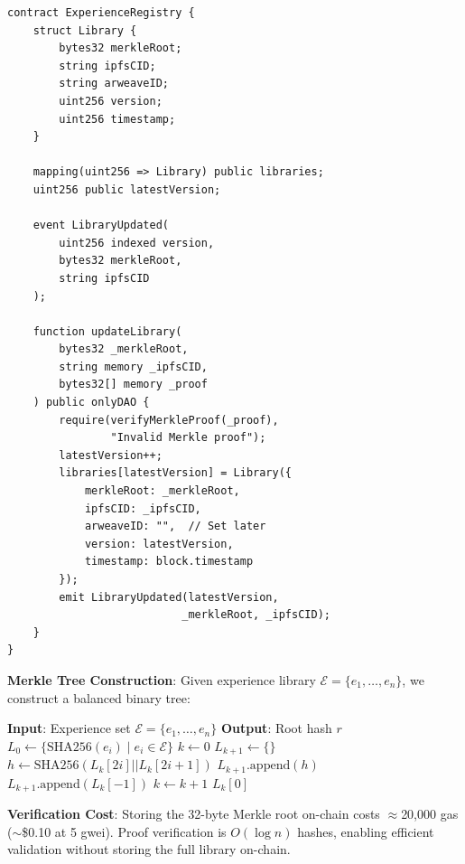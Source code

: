 \begin{lstlisting}[language=Solidity,caption=Experience Registry Contract (Simplified)]
contract ExperienceRegistry {
    struct Library {
        bytes32 merkleRoot;
        string ipfsCID;
        string arweaveID;
        uint256 version;
        uint256 timestamp;
    }
    
    mapping(uint256 => Library) public libraries;
    uint256 public latestVersion;
    
    event LibraryUpdated(
        uint256 indexed version,
        bytes32 merkleRoot,
        string ipfsCID
    );
    
    function updateLibrary(
        bytes32 _merkleRoot,
        string memory _ipfsCID,
        bytes32[] memory _proof
    ) public onlyDAO {
        require(verifyMerkleProof(_proof), 
                "Invalid Merkle proof");
        latestVersion++;
        libraries[latestVersion] = Library({
            merkleRoot: _merkleRoot,
            ipfsCID: _ipfsCID,
            arweaveID: "",  // Set later
            version: latestVersion,
            timestamp: block.timestamp
        });
        emit LibraryUpdated(latestVersion, 
                           _merkleRoot, _ipfsCID);
    }
}
\end{lstlisting}

\textbf{Merkle Tree Construction}: Given experience library $\mathcal{E} = \{e_1, \ldots, e_n\}$, we construct a balanced binary tree:

\begin{algorithm}[t]
\caption{Merkle Tree Construction}
\label{alg:merkle}
\begin{algorithmic}[1]
\STATE \textbf{Input}: Experience set $\mathcal{E} = \{e_1, \ldots, e_n\}$
\STATE \textbf{Output}: Root hash $r$
\STATE $L_0 \leftarrow \{\text{SHA256}(e_i) \mid e_i \in \mathcal{E}\}$
\STATE $k \leftarrow 0$
    \STATE $L_{k+1} \leftarrow \{\}$
        \STATE $h \leftarrow \text{SHA256}(L_k[2i] || L_k[2i+1])$
        \STATE $L_{k+1}.\text{append}(h)$
    \ENDFOR
        \STATE $L_{k+1}.\text{append}(L_k[-1])$ 
    \ENDIF
    \STATE $k \leftarrow k + 1$
\ENDWHILE
\RETURN $L_k[0]$
\end{algorithmic}
\end{algorithm}

\textbf{Verification Cost}: Storing the 32-byte Merkle root on-chain costs $\approx$20,000 gas ($\sim$\$0.10 at 5 gwei). Proof verification is $O(\log n)$ hashes, enabling efficient validation without storing the full library on-chain.

